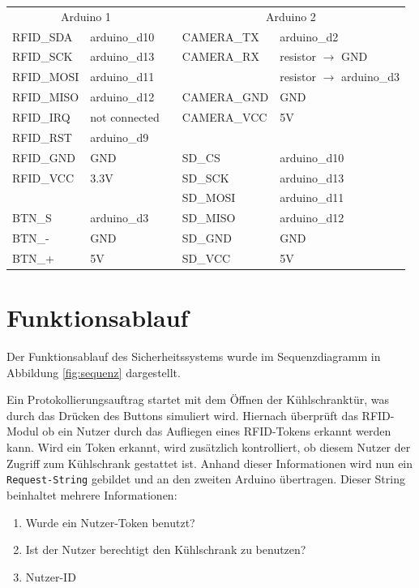 \documentclass[a4paper, 11pt]{article}
\begin{document}
\begin{table}[htb]
\begin{tabular}{@{}lllll@{}}
\toprule
\multicolumn{2}{c}{Arduino 1} &  & \multicolumn{2}{c}{Arduino 2}                    \\ \cmidrule(r){1-2} \cmidrule(l){4-5} 
RFID\_SDA    & arduino\_d10   &  & CAMERA\_TX  & arduino\_d2                        \\
RFID\_SCK    & arduino\_d13   &  & CAMERA\_RX  & resistor $\rightarrow$ GND         \\
RFID\_MOSI   & arduino\_d11   &  &             & resistor $\rightarrow$ arduino\_d3 \\
RFID\_MISO   & arduino\_d12   &  & CAMERA\_GND & GND                                \\
RFID\_IRQ    & not connected  &  & CAMERA\_VCC & 5V                                 \\
RFID\_RST    & arduino\_d9    &  &             &                                    \\ 
RFID\_GND    & GND            &  & SD\_CS      & arduino\_d10                       \\
RFID\_VCC    & 3.3V           &  & SD\_SCK     & arduino\_d13                       \\
                &                &  & SD\_MOSI    & arduino\_d11                       \\
BTN\_S       & arduino\_d3    &  & SD\_MISO    & arduino\_d12                       \\
BTN\_-       & GND            &  & SD\_GND     & GND                                \\
BTN\_+       & 5V             &  & SD\_VCC     & 5V                                 \\ \bottomrule
\end{tabular}
\end{table}


\section{Funktionsablauf}
Der Funktionsablauf des Sicherheitssystems wurde im Sequenzdiagramm in Abbildung \ref{fig:sequenz} dargestellt.

Ein Protokollierungsauftrag startet mit dem Öffnen der Kühlschranktür, was durch das Drücken des Buttons simuliert wird. Hiernach überprüft das RFID-Modul ob ein Nutzer durch das Aufliegen eines RFID-Tokens erkannt werden kann. Wird ein Token erkannt, wird zusätzlich kontrolliert, ob diesem Nutzer der Zugriff zum Kühlschrank gestattet ist. Anhand dieser Informationen wird nun ein \texttt{Request-String} gebildet und an den zweiten Arduino übertragen. Dieser String beinhaltet mehrere Informationen:
\begin{enumerate}
\item Wurde ein Nutzer-Token benutzt?
\item Ist der Nutzer berechtigt den Kühlschrank zu benutzen?
\item Nutzer-ID
\end{enumerate}
\end{document}
